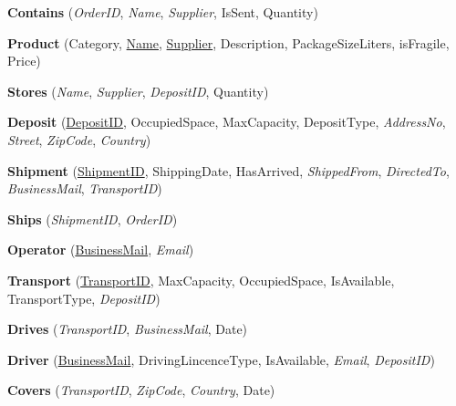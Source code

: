 \textbf{Contains} (\textit{OrderID}, \textit{Name}, \textit{Supplier}, IsSent, Quantity)

\textbf{Product} (Category, \underline{Name}, \underline{Supplier}, Description, PackageSizeLiters, isFragile, Price)

\textbf{Stores} (\textit{Name}, \textit{Supplier}, \textit{DepositID}, Quantity)

\textbf{Deposit} (\underline{DepositID}, OccupiedSpace, MaxCapacity, DepositType, \textit{AddressNo}, \textit{Street}, \textit{ZipCode}, \textit{Country})

\textbf{Shipment} (\underline{ShipmentID}, ShippingDate, HasArrived, \textit{ShippedFrom}, \textit{DirectedTo}, \textit{BusinessMail}, \textit{TransportID})

\textbf{Ships} (\textit{ShipmentID}, \textit{OrderID})

\textbf{Operator} (\underline{BusinessMail}, \textit{Email})

\textbf{Transport} (\underline{TransportID}, MaxCapacity, OccupiedSpace, IsAvailable, TransportType, \textit{DepositID}) 

\textbf{Drives} (\textit{TransportID}, \textit{BusinessMail}, Date)

\textbf{Driver} (\underline{BusinessMail}, DrivingLincenceType, IsAvailable, \textit{Email}, \textit{DepositID})

\textbf{Covers} (\textit{TransportID}, \textit{ZipCode}, \textit{Country}, Date)
